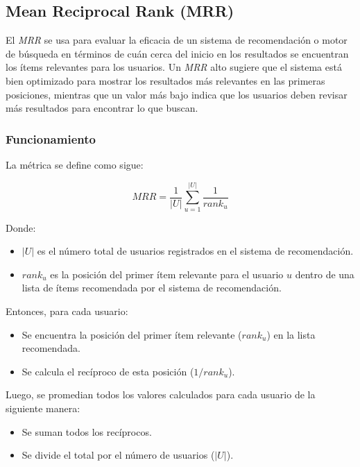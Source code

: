 \documentclass[11pt,a4paper,twoside]{thesis}
\begin{document}
\subsection{Mean Reciprocal Rank (MRR)}

El \textit{MRR} se usa para evaluar la eficacia de un sistema de recomendación o motor de búsqueda en términos de cuán cerca del inicio en los resultados se encuentran los ítems relevantes para los usuarios. Un \textit{MRR} alto sugiere que el sistema está bien optimizado para mostrar los resultados más relevantes en las primeras posiciones, mientras que un valor más bajo indica que los usuarios deben revisar más resultados para encontrar lo que buscan.

\subsubsection{Funcionamiento}

La métrica se define como sigue:

\begin{equation}
	MRR= \frac{1}{|U|} \sum_{u=1}^{|U|} \frac{1}{rank_u}
\end{equation}

Donde:

\begin{itemize}
	\item $|U|$ es el número total de usuarios registrados en el sistema de recomendación.
	\item $rank_u$ es la posición del primer ítem relevante para el usuario $u$ dentro de una lista de ítems recomendada por el sistema de recomendación.
\end{itemize}

Entonces, para cada usuario:

\begin{itemize}
	\item Se encuentra la posición del primer ítem relevante ($rank_u$) en la lista recomendada.
	\item Se calcula el recíproco de esta posición ($1/rank_u$).
\end{itemize}

Luego, se promedian todos los valores calculados para cada usuario de la siguiente manera:
\begin{itemize}
	\item Se suman todos los recíprocos.
	\item Se divide el total por el número de usuarios ($|U|$).
\end{itemize}
\end{document}

